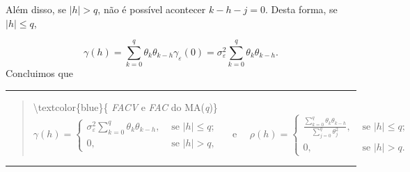 \documentclass[
]{book}
\theoremstyle{definition}
\theoremstyle{definition}
\theoremstyle{definition}
\theoremstyle{remark}
\begin{document}
Além disso, se \(|h|>q\), não é possível acontecer \(k-h-j=0\). Desta forma, se \(|h|\leq q\),

\[  \gamma(h)=\sum_{k=0}^q \theta_k\theta_{k-h}\gamma_\varepsilon(0)=\sigma_\varepsilon^2\sum_{k=0}^q \theta_k\theta_{k-h}.\]
Concluimos que

\begin{center}\rule{0.5\linewidth}{0.5pt}\end{center}

\begin{quote}
\textbackslash textcolor\{blue\}\{ \emph{FACV} e \emph{FAC} do MA(\emph{q})\}
\[\gamma(h)=\left\{
\begin{array}{cc}
\sigma_\varepsilon^2\displaystyle{\sum_{k=0}^q \theta_k\theta_{k-h}},  & \mbox{ se } |h|\leq q;\\
0, &  \mbox{ se } |h|> q,
\end{array}
\right. \quad \mbox{ e } \quad \rho(h)=\left\{
\begin{array}{cc}
\displaystyle{\frac{\sum_{k=0}^q \theta_k\theta_{k-h}}{\sum_{j=0}^q \theta_j^2}},  & \mbox{ se } |h|\leq q;\quad\\
0, &  \mbox{ se } |h|> q.
\end{array}\right.\]
\end{quote}

\begin{center}\rule{0.5\linewidth}{0.5pt}\end{center}
\end{document}

